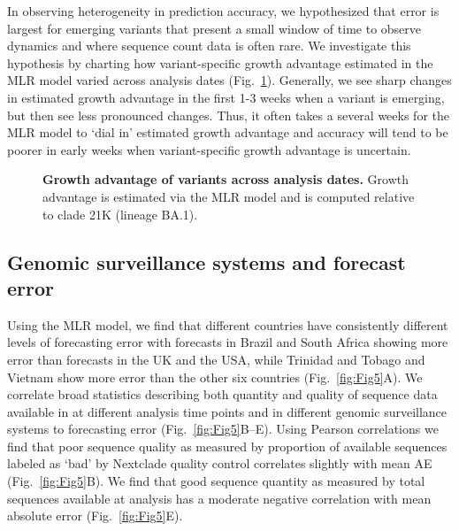 \documentclass[10pt,letterpaper]{article}
\begin{document}
In observing heterogeneity in prediction accuracy, we hypothesized that error is largest for emerging variants that present a small window of time to observe dynamics and where sequence count data is often rare.
We investigate this hypothesis by charting how variant-specific growth advantage estimated in the MLR model varied across analysis dates (Fig.~\ref{fig:Fig4}).
Generally, we see sharp changes in estimated growth advantage in the first 1-3 weeks when a variant is emerging, but then see less pronounced changes.
Thus, it often takes a several weeks for the MLR model to `dial in' estimated growth advantage and accuracy will tend to be poorer in early weeks when variant-specific growth advantage is uncertain.



\begin{figure}[tb!]
	\centering
	\caption{
		\textbf{Growth advantage of variants across analysis dates.}
		Growth advantage is estimated via the MLR model and is computed relative to clade 21K (lineage BA.1).
	}
	\label{fig:Fig4}
\end{figure}





\subsection*{Genomic surveillance systems and forecast error}

Using the MLR model, we find that different countries have consistently different levels of forecasting error with forecasts in Brazil and South Africa showing more error than forecasts in the UK and the USA, while Trinidad and Tobago and Vietnam show more error than the other six countries (Fig.~\ref{fig:Fig5}A).
We correlate broad statistics describing both quantity and quality of sequence data available in at different analysis time points and in different genomic surveillance systems to forecasting error (Fig.~\ref{fig:Fig5}B--E).
Using Pearson correlations we find that poor sequence quality as measured by proportion of available sequences labeled as `bad' by Nextclade quality control \cite{aksamentov2021nextclade} correlates slightly with mean AE (Fig.~\ref{fig:Fig5}B).
We find that good sequence quantity as measured by total sequences available at analysis has a moderate negative correlation with mean absolute error (Fig.~\ref{fig:Fig5}E).
\end{document}
